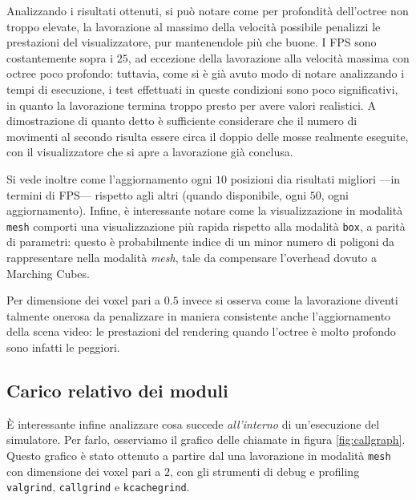 Analizzando i risultati ottenuti, si può notare come per profondità dell'octree non troppo elevate, la lavorazione al massimo della velocità possibile penalizzi le prestazioni del visualizzatore, pur mantenendole più che buone. I FPS sono costantemente sopra i $25$, ad eccezione della lavorazione alla velocità massima con octree poco profondo: tuttavia, come si è già avuto modo di notare analizzando i tempi di esecuzione, i test effettuati in queste condizioni sono poco significativi, in quanto la lavorazione termina troppo presto per avere valori realistici. A dimostrazione di quanto detto è sufficiente considerare che il numero di movimenti al secondo risulta essere circa il doppio delle mosse realmente eseguite, con il visualizzatore che si apre a lavorazione già conclusa.

Si vede inoltre come l'aggiornamento ogni $10$ posizioni dia risultati migliori ---in termini di FPS--- rispetto agli altri (quando disponibile, ogni $50$, ogni aggiornamento). Infine, è interessante notare come la visualizzazione in modalità \texttt{mesh} comporti una visualizzazione più rapida rispetto alla modalità \texttt{box}, a parità di parametri: questo è probabilmente indice di un minor numero di poligoni da rappresentare nella modalità \emph{mesh}, tale da compensare l'overhead dovuto a Marching Cubes.

Per dimensione dei voxel pari a $0.5$ invece si osserva come la lavorazione diventi talmente onerosa da penalizzare in maniera consistente anche l'aggiornamento della scena video: le prestazioni del rendering quando l'octree è molto profondo sono infatti le peggiori.

\subsection{Carico relativo dei moduli}
È interessante infine analizzare cosa succede \textit{all'interno} di un'esecuzione del simulatore. Per farlo, osserviamo il grafico delle chiamate in figura \ref{fig:callgraph}. Questo grafico è stato ottenuto a partire dal una lavorazione in modalità \texttt{mesh} con dimensione dei voxel pari a $2$, con gli strumenti di debug e profiling \texttt{valgrind}, \texttt{callgrind} e \texttt{kcachegrind}.

